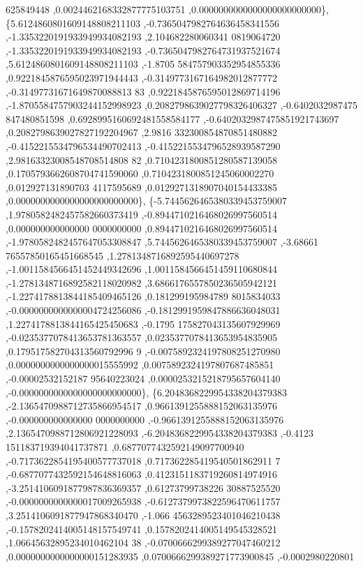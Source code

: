 \begin{DoxyCode}
      625849448 ,0.0024462168332877775103751 ,0.0000000000000000000000000\},
\{5.6124860801609148808211103 ,-0.7365047982764636458341556 ,-1.3353220191933949934082193 ,2.104682280060341
      0819064720 ,-1.3353220191933949934082193 ,-0.7365047982764731937521674 ,5.6124860801609148808211103 ,-1.8705
      584757903352954855336 ,0.9221845876595023971944443 ,-0.3149773167164982012877772 ,-0.31497731671649870088813
      83 ,0.9221845876595012869714196 ,-1.8705584757903244152998923 ,0.2082798639027798326406327 ,-0.6402032987475
      847480851598 ,0.6928995160692481558584177 ,-0.6402032987475851921743697 ,0.2082798639027827192204967 ,2.9816
      332300854870851480882 ,-0.4152215534796534490702413 ,-0.4152215534796528939587290 ,2.98163323008548708514808
      82 ,0.7104231800851280587139058 ,0.1705793662608704741590060 ,0.7104231800851245060002270 ,0.012927131890703
      4117595689 ,0.0129271318907040154433385 ,0.0000000000000000000000000\},
\{-5.7445626465380339453759007 ,1.9780582482457582660373419 ,-0.8944710216468026997560514 ,0.000000000000000
      0000000000 ,0.8944710216468026997560514 ,-1.9780582482457647053308847 ,5.7445626465380339453759007 ,-3.68661
      76557850165451668545 ,1.2781348716892595440697278 ,-1.0011584566451452449342696 ,1.0011584566451459110680844
       ,-1.2781348716892582118020982 ,3.6866176557850236505942121 ,-1.2274178813844185409465126 ,0.181299195984789
      8015834033 ,-0.0000000000000004724256086 ,-0.1812991959847886636048031 ,1.2274178813844165425450683 ,-0.1795
      175827043135607929969 ,-0.0235377078413653781363557 ,0.0235377078413653954835905 ,0.179517582704313560792996
      9 ,-0.0075892324197808251270980 ,0.0000000000000000015555992 ,0.0075892324197807687485851 ,-0.00002532152187
      95640223024 ,0.0000253215218795657604140 ,-0.0000000000000000000000000\},
\{6.2048368229954338204379383 ,-2.1365470988712735866954517 ,0.9661391255888152063135976 ,-0.000000000000000
      0000000000 ,-0.9661391255888152063135976 ,2.1365470988712806921228093 ,-6.2048368229954338204379383 ,-0.4123
      151183719394041737871 ,0.6877077432592149097700940 ,-0.7173622854195400577737018 ,0.717362285419540501862911
      7 ,-0.6877077432592154648816063 ,0.4123151183719260814974916 ,-3.2514106091877987836369357 ,0.61273799738226
      30887525520 ,-0.0000000000000017009265938 ,-0.6127379973822596470611757 ,3.2514106091877947868340470 ,-1.066
      4563289523401046210438 ,-0.1578202414005148157549741 ,0.1578202414005149545328521 ,1.06645632895234010462104
      38 ,-0.0700666299389277047460212 ,0.0000000000000000151283935 ,0.0700666299389271773900845 ,-0.0002980220801

\end{DoxyCode}

